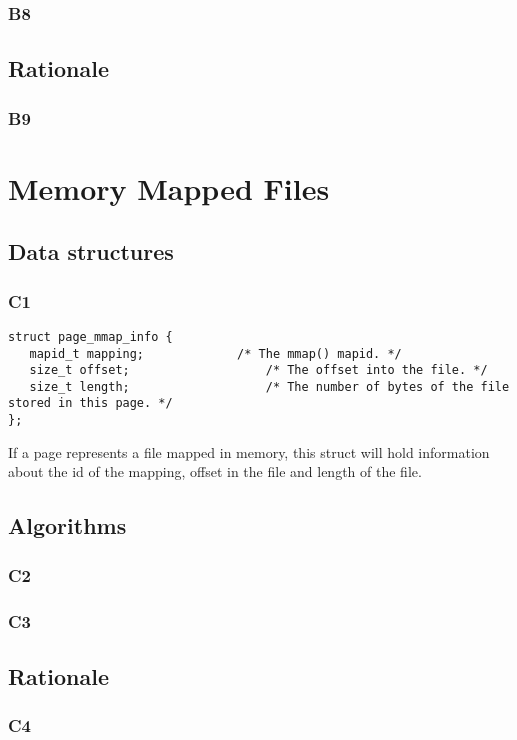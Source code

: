 \documentclass[a4wide, 11pt]{article}
\begin{document}
\subsubsection{B8}

\subsection{Rationale}
\subsubsection{B9}


\section{Memory Mapped Files}
\subsection{Data structures}
\subsubsection{C1}
\begin{verbatim}
struct page_mmap_info {
   mapid_t mapping;				/* The mmap() mapid. */
   size_t offset;					/* The offset into the file. */
   size_t length;					/* The number of bytes of the file stored in this page. */
};
\end{verbatim}
If a page represents a file mapped in memory, this struct will hold information about the id of the mapping, offset in the file and length of the file.

\subsection{Algorithms}
\subsubsection{C2}

\subsubsection{C3}

\subsection{Rationale}
\subsubsection{C4}
\end{document}
